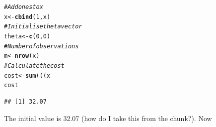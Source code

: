 \documentclass[12pt, a4paper, oneside]{article}\usepackage[]{graphicx}\usepackage[]{color}
\makeatletter
\newcommand{\hlcom}[1]{\textcolor[rgb]{0.678,0.584,0.686}{\textit{#1}}}%
\newcommand{\hlkwd}[1]{\textcolor[rgb]{0.737,0.353,0.396}{\textbf{#1}}}%
\newenvironment{kframe}{%
 \def\at@end@of@kframe{}%
 \ifinner\ifhmode%
  \def\at@end@of@kframe{\end{minipage}}%
  \begin{minipage}{\columnwidth}%
 \fi\fi%
 \def\FrameCommand##1{\hskip\@totalleftmargin \hskip-\fboxsep
 \colorbox{shadecolor}{##1}\hskip-\fboxsep
     \hskip-\linewidth \hskip-\@totalleftmargin \hskip\columnwidth}%
 \MakeFramed {\advance\hsize-\width
   \@totalleftmargin\z@ \linewidth\hsize
   \@setminipage}}%
 {\par\unskip\endMakeFramed%
 \at@end@of@kframe}
\newenvironment{knitrout}{}{} %
\makeatother
\begin{document}
\begin{knitrout}
\color{fgcolor}\begin{kframe}
\begin{alltt}
\hlcom{# Add ones to x}
x <- \hlkwd{cbind}(1, x)
\hlcom{# Initialise theta vector}
theta <- \hlkwd{c}(0, 0)
\hlcom{# Number of observations}
m <- \hlkwd{nrow}(x)
\hlcom{# Calculate the cost}
cost <- \hlkwd{sum}(((x %
cost
\end{alltt}
\begin{verbatim}
## [1] 32.07
\end{verbatim}
\end{kframe}
\end{knitrout}

The initial value is 32.07 (how do I take this from the chunk?).  Now 
\end{document}
